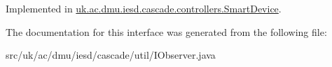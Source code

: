 Implemented in \hyperlink{classuk_1_1ac_1_1dmu_1_1iesd_1_1cascade_1_1controllers_1_1_smart_device_ace97b6fc3cc098a8b70191f7a6be50da}{uk.\-ac.\-dmu.\-iesd.\-cascade.\-controllers.\-Smart\-Device}.



The documentation for this interface was generated from the following file\-:\begin{DoxyCompactItemize}
\item 
src/uk/ac/dmu/iesd/cascade/util/I\-Observer.\-java\end{DoxyCompactItemize}
